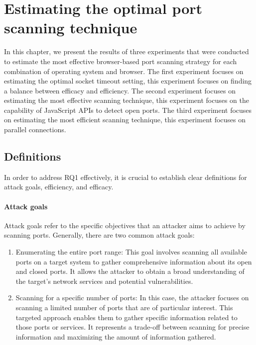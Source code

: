 \chapter{Estimating the optimal port scanning technique}
\label{chapter:scanning-techniques-experiment}

In this chapter, we present the results of three experiments that were conducted to estimate the most effective browser-based port scanning strategy for each combination of operating system and browser. 
The first experiment focuses on estimating the optimal socket timeout setting, this experiment focuses on finding a balance between efficacy and efficiency.
The second experiment focuses on estimating the most effective scanning technique, this experiment focuses on the capability of JavaScript APIs to detect open ports.
The third experiment focuses on estimating the most efficient scanning technique, this experiment focuses on parallel connections.

\section{Definitions}

In order to address RQ1 effectively, it is crucial to establish clear definitions for attack goals, efficiency, and efficacy.

\subsubsection{Attack goals}

Attack goals refer to the specific objectives that an attacker aims to achieve by scanning ports. Generally, there are two common attack goals:

\begin{enumerate}[label=\alph*.]
    \item Enumerating the entire port range: This goal involves scanning all available ports on a target system to gather comprehensive information about its open and closed ports. It allows the attacker to obtain a broad understanding of the target's network services and potential vulnerabilities.
    
    \item Scanning for a specific number of ports: In this case, the attacker focuses on scanning a limited number of ports that are of particular interest. This targeted approach enables them to gather specific information related to those ports or services. It represents a trade-off between scanning for precise information and maximizing the amount of information gathered.
\end{enumerate}


